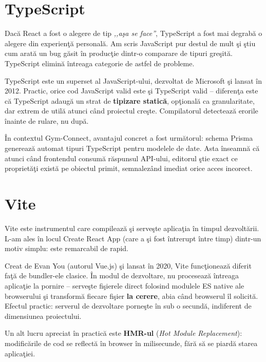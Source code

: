 \section{TypeScript}

Dac\u a React a fost o alegere de tip \textit{,,a\c sa se face''},
TypeScript \cite{typescript2024} a fost mai degrab\u a o alegere
din experien\c t\u a personal\u a. Am scris JavaScript pur destul
de mult \c si \c stiu cum arat\u a un bug g\u asit \^ in produc\c tie
dintr-o comparare de tipuri gre\c sit\u a. TypeScript elimin\u a
\^ intreaga categorie de astfel de probleme.

TypeScript este un superset al JavaScript-ului, dezvoltat de
Microsoft \c si lansat \^ in 2012. Practic, orice cod JavaScript
valid este \c si TypeScript valid -- diferen\c ta este c\u a
TypeScript adaug\u a un strat de \textbf{tipizare static\u a},
op\c tional\u a ca granularitate, dar extrem de util\u a atunci
c\^ and proiectul cre\c ste. Compilatorul detecteaz\u a erorile
\^ inainte de rulare, nu dup\u a.

\^ In contextul Gym-Connect, avantajul concret a fost urm\u atorul:
schema Prisma genereaz\u a automat tipuri TypeScript pentru
modelele de date. Asta \^ inseamn\u a c\u a atunci c\^ and
frontendul consum\u a r\u aspunsul API-ului, editorul \c stie
exact ce propriet\u a\c ti exist\u a pe obiectul primit, semnalez\^ and
imediat orice acces incorect.

\section{Vite}

Vite \cite{vite2024} este instrumentul care compileaz\u a \c si
serve\c ste aplica\c tia \^ in timpul dezvolt\u arii. L-am ales \^ in
locul Create React App (care a \c si fost \^ intrerupt \^ intre timp)
dintr-un motiv simplu: este remarcabil de rapid.

Creat de Evan You (autorul Vue.js) \c si lansat \^ in 2020, Vite
func\c tioneaz\u a diferit fa\c t\u a de bundler-ele clasice. \^ In
modul de dezvoltare, nu proceseaz\u a \^ intreaga aplica\c tie la
pornire -- serve\c ste fi\c sierele direct folosind modulele ES
native ale browserului \c si transform\u a fiecare fi\c sier
\textbf{la cerere}, abia c\^ and browserul \^ il solicit\u a. Efectul
practic: serverul de dezvoltare porne\c ste \^ in sub o secund\u a,
indiferent de dimensiunea proiectului.

Un alt lucru apreciat \^ in practic\u a este \textbf{HMR-ul}
(\textit{Hot Module Replacement}): modific\u arile de cod se
reflect\u a \^ in browser \^ in milisecunde, f\u ar\u a s\u a se piard\u a
starea aplica\c tiei.

